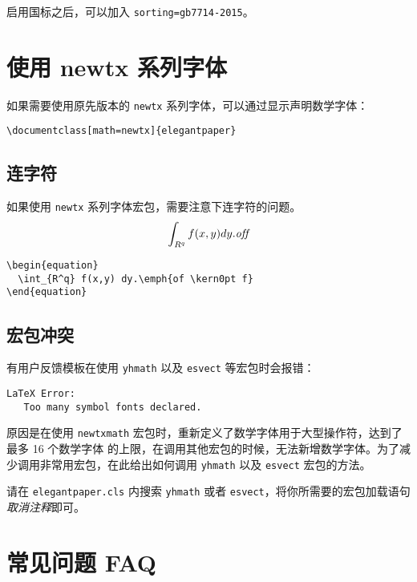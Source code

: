 \documentclass[lang=cn,11pt,a4paper]{elegantpaper}
\begin{document}
启用国标之后，可以加入 \lstinline{sorting=gb7714-2015}。


\section{使用 newtx 系列字体}

如果需要使用原先版本的 \lstinline{newtx} 系列字体，可以通过显示声明数学字体：

\begin{lstlisting}
\documentclass[math=newtx]{elegantpaper}
\end{lstlisting}

\subsection{连字符}

如果使用 \lstinline{newtx} 系列字体宏包，需要注意下连字符的问题。
\begin{equation}
  \int_{R^q} f(x,y) dy.\emph{of\kern0pt f}
\end{equation}

\begin{lstlisting}
\begin{equation}
  \int_{R^q} f(x,y) dy.\emph{of \kern0pt f}
\end{equation}
\end{lstlisting}

\subsection{宏包冲突}

有用户反馈模板在使用 \lstinline{yhmath} 以及 \lstinline{esvect} 等宏包时会报错：
\begin{lstlisting}
LaTeX Error:
   Too many symbol fonts declared.
\end{lstlisting}

原因是在使用 \lstinline{newtxmath} 宏包时，重新定义了数学字体用于大型操作符，达到了 {\heiti 最多 16 个数学字体} 的上限，在调用其他宏包的时候，无法新增数学字体。为了减少调用非常用宏包，在此给出如何调用 \lstinline{yhmath} 以及 \lstinline{esvect} 宏包的方法。

请在 \lstinline{elegantpaper.cls} 内搜索 \lstinline{yhmath} 或者 \lstinline{esvect}，将你所需要的宏包加载语句\textit{取消注释}即可。


\section{常见问题 FAQ}
\end{document}
